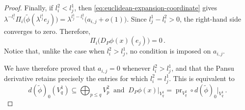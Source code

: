 \documentclass[dvipsnames]{amsart}
\theoremstyle{definition}
\theoremstyle{definition}
\numberwithin{equation}{section}
\begin{document}
\begin{proof}
Finally, if \(l_i^2<l_j^1\), then
\eqref{eq:euclidean-expansion-coordinate} gives $\lambda^{-l_i^2}
\Pi_i\bigl(\widetilde\phi(\lambda^{l_j^1}e_j)\bigr)
=
\lambda^{l_j^1-l_i^2}\bigl(a_{i,j}+o(1)\bigr)$.
Since \(l_j^1-l_i^2>0\), the right-hand side converges to zero.
Therefore,
\[
\Pi_i\bigl(D_P\phi(x)(e_j)\bigr)=0\,.
\]
Notice that, unlike the case when $l_i^2>l_j^1$, no condition is imposed on \(a_{i,j}\).

We have therefore proved that $a_{i,j}=0$ whenever $l_i^2>l_j^1$, and that the Pansu derivative retains precisely the entries for which $l_i^2=l_j^1$. This is equivalent to
\[
d(\widetilde\phi)_0(V_q^1)
\subseteq
\bigoplus_{p\leq q}V_p^2
\ \text{ and }\ 
D_P\phi(x)\big|_{V_q^1}
=
\operatorname{pr}_{V_q^2}
\circ d(\widetilde\phi)_0\big|_{V_q^1}\,.
\]
\end{proof}
\end{document}
